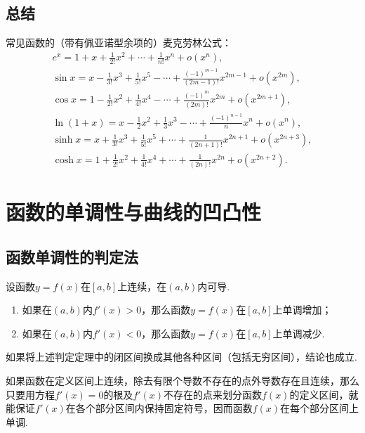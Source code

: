 
\subsection{总结}
常见函数的（带有佩亚诺型余项的）麦克劳林公式：
\begin{gather}
e^x = 1 + x + \frac{1}{2!} x^2 + \dotsb + \frac{1}{n!} x^n + o(x^n), \\
\sin x = x - \frac{1}{3!} x^3 + \frac{1}{5!} x^5 - \dotsb + \frac{(-1)^{m-1}}{(2m-1)!} x^{2m-1} + o(x^{2m}), \\
\cos x = 1 - \frac{1}{2!} x^2 + \frac{1}{4!} x^4 - \dotsb + \frac{(-1)^m}{(2m)!} x^{2m} + o(x^{2m+1}), \\
\ln(1+x) = x - \frac{1}{2} x^2 + \frac{1}{3} x^3 - \dotsb + \frac{(-1)^{n-1}}{n} x^n + o(x^n), \\
\sinh x = x + \frac{1}{3!} x^3 + \frac{1}{5!} x^5 + \dotsb + \frac{1}{(2n+1)!} x^{2n+1} + o(x^{2n+3}), \\
\cosh x = 1 + \frac{1}{2!} x^2 + \frac{1}{4!} x^4 + \dotsb + \frac{1}{(2n)!} x^{2n} + o(x^{2n+2}).
\end{gather}

\section{函数的单调性与曲线的凹凸性}
\subsection{函数单调性的判定法}
\begin{theorem}[函数的单调性]
设函数\(y=f(x)\)在\([a,b]\)上连续，在\((a,b)\)内可导.
\begin{enumerate}
\item 如果在\((a,b)\)内\(f'(x)>0\)，那么函数\(y=f(x)\)在\([a,b]\)上单调增加；
\item 如果在\((a,b)\)内\(f'(x)<0\)，那么函数\(y=f(x)\)在\([a,b]\)上单调减少.
\end{enumerate}
如果将上述判定定理中的闭区间换成其他各种区间（包括无穷区间），结论也成立.
\end{theorem}

如果函数在定义区间上连续，除去有限个导数不存在的点外导数存在且连续，那么只要用方程\(f'(x) = 0\)的根及\(f'(x)\)不存在的点来划分函数\(f(x)\)的定义区间，就能保证\(f'(x)\)在各个部分区间内保持固定符号，因而函数\(f(x)\)在每个部分区间上单调.

